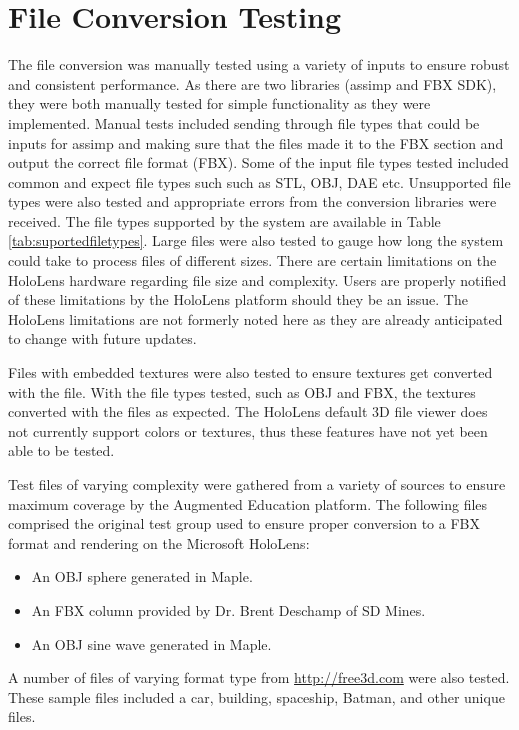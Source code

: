 
\section{File Conversion Testing}
    The file conversion was manually tested using a variety of inputs to ensure robust and consistent performance. As there are two libraries (assimp and FBX SDK), they were both manually tested for simple functionality as they were implemented. Manual tests included sending through file types that could be inputs for assimp and making sure that the files made it to the FBX section and output the correct file format (FBX). Some of the input file types tested included common and expect file types such such as STL, OBJ, DAE etc. Unsupported file types were also tested and appropriate errors from the conversion libraries were received. The file types supported by the system are available in Table \ref{tab:suportedfiletypes}. Large files were also tested to gauge how long the system could take to process files of different sizes. There are certain limitations on the HoloLens hardware regarding file size and complexity. Users are properly notified of these limitations by the HoloLens platform should they be an issue. The HoloLens limitations are not formerly noted here as they are already anticipated to change with future updates.  

    Files with embedded textures were also tested to ensure textures get converted with the file. With the file types tested, such as OBJ and FBX, the textures converted with the files as expected. The HoloLens default 3D file viewer does not currently support colors or textures, thus these features have not yet been able to be tested.

    Test files of varying complexity were gathered from a variety of sources to ensure maximum coverage by the Augmented Education platform. The following files comprised the original test group used to ensure proper conversion to a FBX format and rendering on the Microsoft HoloLens:
    \begin{itemize}
        \item An OBJ sphere generated in Maple.
        \item An FBX column provided by Dr. Brent Deschamp of SD Mines.
        \item An OBJ sine wave generated in Maple.
    \end{itemize} 
    
    A number of files of varying format type from \url{http://free3d.com} were also tested. These sample files included a car, building, spaceship, Batman, and other unique files. 
    
